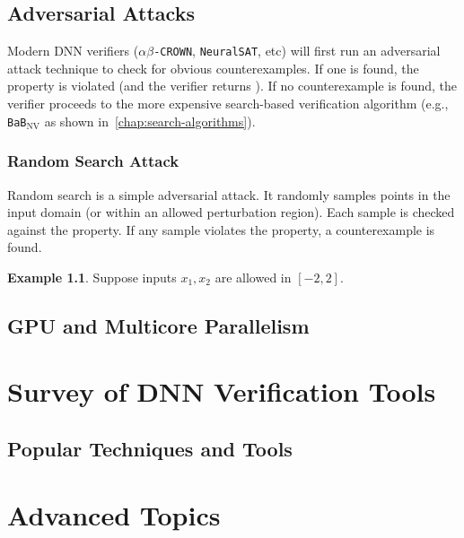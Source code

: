 \documentclass[oneside,11pt,dvipsnames]{book}
\numberwithin{equation}{section}
\theoremstyle{definition}
\newtheorem{example}{Example}[section]
\theoremstyle{remark}
\newcommand{\crown}{\texttt{$\alpha\beta$-CROWN}}
\newcommand{\bab}{\texttt{BaB$_{\text{NV}}$}}
\newcommand{\neuralsat}{\texttt{NeuralSAT}}
\begin{document}
\chapter{Adversarial Attacks}

Modern DNN verifiers (\crown{}, \neuralsat{}, etc) will first run an adversarial attack technique to check for obvious counterexamples. If one is found, the property is violated (and the verifier returns \sat). If no counterexample is found, the verifier proceeds to the more expensive search-based verification algorithm (e.g., \bab{} as shown in~\autoref{chap:search-algorithms}).

\section{Random Search Attack}
Random search is a simple adversarial attack.  It randomly samples points in the input domain (or within an allowed perturbation region). Each sample is checked against the property.  If any sample violates the property, a counterexample is found.

\begin{example}
Suppose inputs $x_1, x_2$ are allowed in $[-2, 2]$.


\end{example}
\chapter{GPU and Multicore Parallelism}


\part{Survey of DNN Verification Tools}

\chapter{Popular Techniques and Tools}




\part{Advanced Topics\label{part:advanced-topics}}
\end{document}
